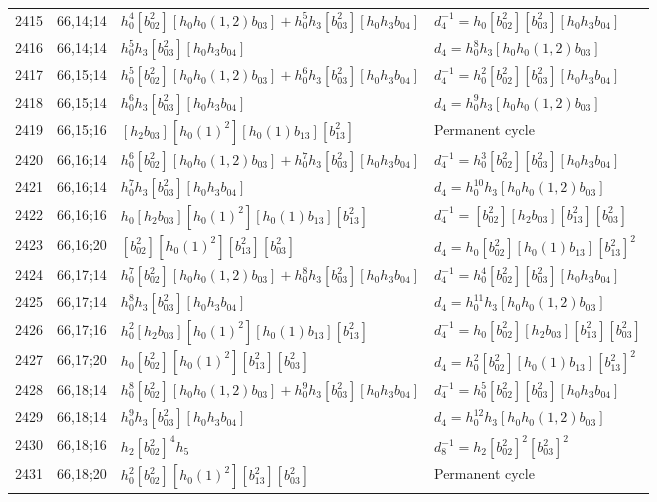 \documentclass{article}
\begin{document}
\begin{longtable}{|l|l|>{\raggedright\arraybackslash}p{6cm}|>{\raggedright\arraybackslash}p{6cm}|}
\hline
2415 & 66,14;14 & $h_0^4[b_{02}^2][h_0h_0(1, 2)b_{03}] + h_0^5h_3[b_{03}^2][h_0h_3b_{04}]$ & $d_{4}^{-1}=h_0[b_{02}^2][b_{03}^2][h_0h_3b_{04}]$\\
2416 & 66,14;14 & $h_0^5h_3[b_{03}^2][h_0h_3b_{04}]$ &$d_{4}=h_0^8h_3[h_0h_0(1, 2)b_{03}]$\\
\hline
2417 & 66,15;14 & $h_0^5[b_{02}^2][h_0h_0(1, 2)b_{03}] + h_0^6h_3[b_{03}^2][h_0h_3b_{04}]$ & $d_{4}^{-1}=h_0^2[b_{02}^2][b_{03}^2][h_0h_3b_{04}]$\\
2418 & 66,15;14 & $h_0^6h_3[b_{03}^2][h_0h_3b_{04}]$ &$d_{4}=h_0^9h_3[h_0h_0(1, 2)b_{03}]$\\
\hline
2419 & 66,15;16 & $[h_2b_{03}][h_0(1)^2][h_0(1)b_{13}][b_{13}^2]$ & Permanent cycle\\
\hline
2420 & 66,16;14 & $h_0^6[b_{02}^2][h_0h_0(1, 2)b_{03}] + h_0^7h_3[b_{03}^2][h_0h_3b_{04}]$ & $d_{4}^{-1}=h_0^3[b_{02}^2][b_{03}^2][h_0h_3b_{04}]$\\
2421 & 66,16;14 & $h_0^7h_3[b_{03}^2][h_0h_3b_{04}]$ &$d_{4}=h_0^{10}h_3[h_0h_0(1, 2)b_{03}]$\\
\hline
2422 & 66,16;16 & $h_0[h_2b_{03}][h_0(1)^2][h_0(1)b_{13}][b_{13}^2]$ & $d_{4}^{-1}=[b_{02}^2][h_2b_{03}][b_{13}^2][b_{03}^2]$\\
\hline
2423 & 66,16;20 & $[b_{02}^2][h_0(1)^2][b_{13}^2][b_{03}^2]$ &$d_{4}=h_0[b_{02}^2][h_0(1)b_{13}][b_{13}^2]^2$\\
\hline
2424 & 66,17;14 & $h_0^7[b_{02}^2][h_0h_0(1, 2)b_{03}] + h_0^8h_3[b_{03}^2][h_0h_3b_{04}]$ & $d_{4}^{-1}=h_0^4[b_{02}^2][b_{03}^2][h_0h_3b_{04}]$\\
2425 & 66,17;14 & $h_0^8h_3[b_{03}^2][h_0h_3b_{04}]$ &$d_{4}=h_0^{11}h_3[h_0h_0(1, 2)b_{03}]$\\
\hline
2426 & 66,17;16 & $h_0^2[h_2b_{03}][h_0(1)^2][h_0(1)b_{13}][b_{13}^2]$ & $d_{4}^{-1}=h_0[b_{02}^2][h_2b_{03}][b_{13}^2][b_{03}^2]$\\
\hline
2427 & 66,17;20 & $h_0[b_{02}^2][h_0(1)^2][b_{13}^2][b_{03}^2]$ &$d_{4}=h_0^2[b_{02}^2][h_0(1)b_{13}][b_{13}^2]^2$\\
\hline
2428 & 66,18;14 & $h_0^8[b_{02}^2][h_0h_0(1, 2)b_{03}] + h_0^9h_3[b_{03}^2][h_0h_3b_{04}]$ & $d_{4}^{-1}=h_0^5[b_{02}^2][b_{03}^2][h_0h_3b_{04}]$\\
2429 & 66,18;14 & $h_0^9h_3[b_{03}^2][h_0h_3b_{04}]$ &$d_{4}=h_0^{12}h_3[h_0h_0(1, 2)b_{03}]$\\
\hline
2430 & 66,18;16 & $h_2[b_{02}^2]^4h_5$ & $d_{8}^{-1}=h_2[b_{02}^2]^2[b_{03}^2]^2$\\
\hline
2431 & 66,18;20 & $h_0^2[b_{02}^2][h_0(1)^2][b_{13}^2][b_{03}^2]$ & Permanent cycle\\

\end{longtable}
\end{document}

